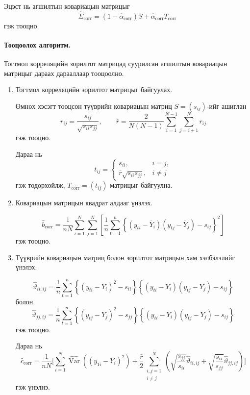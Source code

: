 Эцэст нь агшилтын ковариацын
матрицыг
\[
\widehat{\Sigma}_{\mathrm{corr}}
=
(1-\widehat{\alpha}_{\mathrm{corr}})S
+
\widehat{\alpha}_{\mathrm{corr}}
T_{\mathrm{corr}}
\]
гэж тооцно.

\paragraph{Тооцоолох алгоритм.}

Тогтмол корреляцийн зорилтот матрицад
суурилсан агшилтын ковариацын матрицыг
дараах дарааллаар тооцоолно.

\begin{enumerate}
	\item Тогтмол корреляцийн зорилтот
	матрицыг байгуулах.
	
	Өмнөх хэсэгт тооцсон түүврийн
	ковариацын матриц $S=(s_{ij})$-ийг
	ашиглан
	\[
	r_{ij}
	=
	\frac{s_{ij}}{\sqrt{s_{ii}s_{jj}}},
	\qquad
	\bar r
	=
	\frac{2}{N(N-1)}
	\sum_{i=1}^{N-1}
	\sum_{j=i+1}^{N}r_{ij}
	\]
	гэж тооцно.
	
	Дараа нь
	\[
	t_{ij}
	=
	\begin{cases}
		s_{ii}, & i=j,\\
		\bar r\sqrt{s_{ii}s_{jj}}, & i\neq j
	\end{cases}
	\]
	гэж тодорхойлж,
	$T_{\mathrm{corr}}=(t_{ij})$
	матрицыг байгуулна.
	
	\item Ковариацын матрицын
	квадрат алдааг үнэлэх.
	
	\[
	\widehat b_{\mathrm{corr}}
	=
	\frac{1}{nN}
	\sum_{i=1}^{N}\sum_{j=1}^{N}
	\left[
	\frac{1}{n}
	\sum_{t=1}^{n}
	\left\{
	(y_{ti}-\overline{Y}_i)
	(y_{tj}-\overline{Y}_j)-s_{ij}
	\right\}^2
	\right]
	\]
	гэж тооцно.
	
	\item Түүврийн ковариацын матриц
	болон зорилтот матрицын
	хам хэлбэлзлийг үнэлэх.
	
	\[
	\widehat{\vartheta}_{ii,ij}
	=
	\frac{1}{n}
	\sum_{t=1}^{n}
	\left\{
	(y_{ti}-\overline{Y}_i)^2-s_{ii}
	\right\}
	\left\{
	(y_{ti}-\overline{Y}_i)
	(y_{tj}-\overline{Y}_j)-s_{ij}
	\right\}
	\]
	болон
	\[
	\widehat{\vartheta}_{jj,ij}
	=
	\frac{1}{n}
	\sum_{t=1}^{n}
	\left\{
	(y_{tj}-\overline{Y}_j)^2-s_{jj}
	\right\}
	\left\{
	(y_{ti}-\overline{Y}_i)
	(y_{tj}-\overline{Y}_j)-s_{ij}
	\right\}
	\]
	гэж тооцно.
	
	Дараа нь
	\[
	\widehat c_{\mathrm{corr}}
	=
	\frac{1}{nN}
	\Bigg[
	\sum_{i=1}^{N}
	\widehat{\operatorname{Var}}
	\left((y_{1i}-\overline{Y}_i)^2\right)+
	\frac{\bar r}{2}
	\sum_{\substack{i,j=1\\i\neq j}}^{N}
	\left(
	\sqrt{\frac{s_{jj}}{s_{ii}}}
	\widehat{\vartheta}_{ii,ij}
	+
	\sqrt{\frac{s_{ii}}{s_{jj}}}
	\widehat{\vartheta}_{jj,ij}
	\right)
	\Bigg]
	\]
	гэж үнэлнэ.
	

\end{enumerate}
